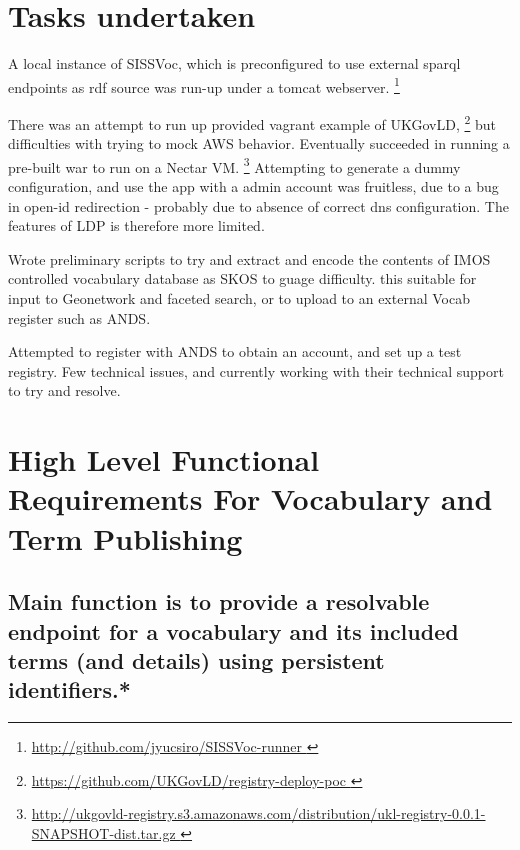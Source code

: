 \documentclass[10pt,a4paper]{article}
\begin{document}
\begin{flushleft}
\section{
  Tasks undertaken
}



  \item[] A local instance of SISSVoc, which is preconfigured to use
  external sparql endpoints as rdf source was run-up under a tomcat webserver.
  \footnote{ \url { http://github.com/jyucsiro/SISSVoc-runner }  } 

  \item[] There was an attempt to run up provided vagrant example of UKGovLD, 
  \footnote{ \url { https://github.com/UKGovLD/registry-deploy-poc } } but
  difficulties with trying to mock AWS behavior. Eventually succeeded in running a pre-built war 
  to run on a Nectar VM. 
  \footnote{ \url { 
  http://ukgovld-registry.s3.amazonaws.com/distribution/ukl-registry-0.0.1-SNAPSHOT-dist.tar.gz
  }}
%
  Attempting to generate a dummy configuration, and use the app with 
	a admin account was fruitless, due to a bug in open-id redirection - probably
  due to absence of correct dns configuration.
%
  The features of LDP is therefore more limited.

  \item[] 
  Wrote preliminary scripts to try and extract and encode the contents of IMOS
  controlled vocabulary database as SKOS to guage difficulty. this suitable for input to Geonetwork 
  and faceted search, or to upload to an external Vocab register such as ANDS.

  \item[] 
	Attempted to register with ANDS to obtain an account, and set up a test
	registry. Few technical issues, and currently working with their technical
	support to try and resolve.
		

\section { 
	High Level Functional Requirements For Vocabulary and Term Publishing
}

  \subsection{
   Main function is to provide a resolvable endpoint for a vocabulary and its
  included terms (and details) using persistent identifiers.* 
  }


\end{flushleft}
\end{document}
